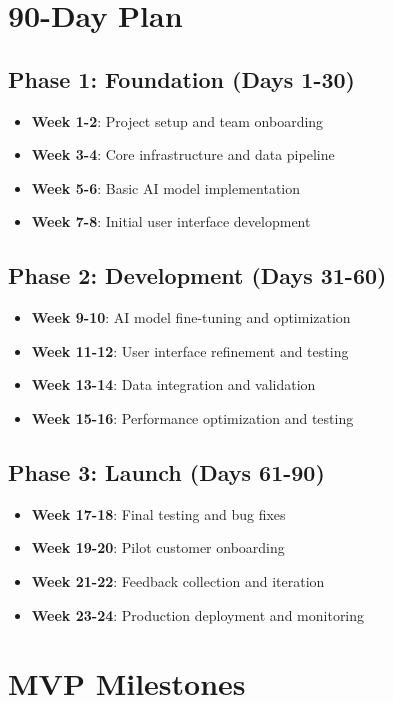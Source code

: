 \documentclass[business]{../templates/infraradar-main}
\begin{document}
\section{90-Day Plan}

\subsection{Phase 1: Foundation (Days 1-30)}
\begin{itemize}
    \item \textbf{Week 1-2}: Project setup and team onboarding
    \item \textbf{Week 3-4}: Core infrastructure and data pipeline
    \item \textbf{Week 5-6}: Basic AI model implementation
    \item \textbf{Week 7-8}: Initial user interface development
\end{itemize}

\subsection{Phase 2: Development (Days 31-60)}
\begin{itemize}
    \item \textbf{Week 9-10}: AI model fine-tuning and optimization
    \item \textbf{Week 11-12}: User interface refinement and testing
    \item \textbf{Week 13-14}: Data integration and validation
    \item \textbf{Week 15-16}: Performance optimization and testing
\end{itemize}

\subsection{Phase 3: Launch (Days 61-90)}
\begin{itemize}
    \item \textbf{Week 17-18}: Final testing and bug fixes
    \item \textbf{Week 19-20}: Pilot customer onboarding
    \item \textbf{Week 21-22}: Feedback collection and iteration
    \item \textbf{Week 23-24}: Production deployment and monitoring
\end{itemize}

\section{MVP Milestones}
\end{document}
